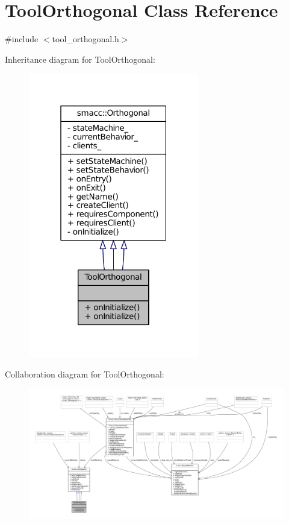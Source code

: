 \hypertarget{classToolOrthogonal}{}\section{Tool\+Orthogonal Class Reference}
\label{classToolOrthogonal}


{\ttfamily \#include $<$tool\+\_\+orthogonal.\+h$>$}



Inheritance diagram for Tool\+Orthogonal\+:
\nopagebreak
\begin{figure}[H]
\begin{center}
\leavevmode
\includegraphics[width=211pt]{classToolOrthogonal__inherit__graph}
\end{center}
\end{figure}


Collaboration diagram for Tool\+Orthogonal\+:
\nopagebreak
\begin{figure}[H]
\begin{center}
\leavevmode
\includegraphics[width=350pt]{classToolOrthogonal__coll__graph}
\end{center}
\end{figure}
